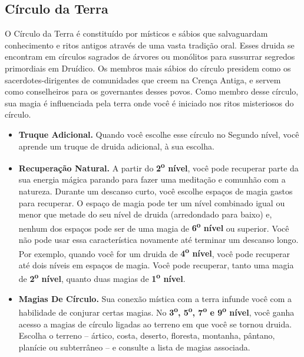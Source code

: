 \documentclass[a4paper,12p]{book}
\begin{document}
		{
		\subsection{Círculo da Terra}
		O Círculo da Terra é constituído por místicos e sábios que salvaguardam conhecimento e ritos antigos através de uma vasta tradição oral. Esses druida se encontram em círculos sagrados de árvores ou monólitos para sussurrar segredos primordiais em Druídico. Os membros mais sábios do círculo presidem como os sacerdotes-dirigentes de comunidades que creem na Crença Antiga, e servem como conselheiros para os governantes desses povos. Como membro desse círculo, sua magia é influenciada pela terra onde você é iniciado nos ritos misteriosos do círculo.
		
		\begin{multicols}{2}
				\begin{itemize}
				\item \textbf{Truque Adicional.} Quando você escolhe esse círculo no Segundo nível, você aprende um truque de druida adicional, à sua escolha.
				
				\item \textbf{Recuperação Natural.} A partir do \textbf{2\textsuperscript{o} nível}, você pode recuperar parte da sua energia mágica parando para fazer uma meditação e comunhão com a natureza. Durante um descanso curto, você escolhe espaços de magia gastos para recuperar. O espaço de magia pode ter um nível combinado igual ou menor que metade do seu nível de druida (arredondado para baixo) e, nenhum dos espaços pode ser de uma magia de \textbf{6\textsuperscript{o} nível} ou superior. Você não pode usar essa característica novamente até terminar um descanso longo.
				Por exemplo, quando você for um druida de \textbf{4\textsuperscript{o} nível}, você pode recuperar até dois níveis em espaços de magia. Você pode recuperar, tanto uma magia de \textbf{2\textsuperscript{o} nível}, quanto duas magias de \textbf{1\textsuperscript{o} nível}.
				
				\item \textbf{Magias De Círculo.} Sua conexão mística com a terra infunde você com a habilidade de conjurar certas magias. No \textbf{3\textsuperscript{o}, 5\textsuperscript{o}, 7\textsuperscript{o} e 9\textsuperscript{o} nível}, você ganha acesso a magias de círculo ligadas ao terreno em que você se tornou druida. Escolha o terreno – ártico, costa, deserto, floresta, montanha, pântano, planície ou subterrâneo – e consulte a lista de magias associada.
				

\end{itemize}
\end{multicols}}
\end{document}
